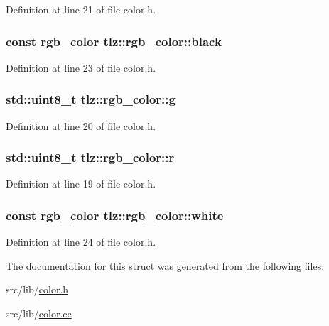 Definition at line 21 of file color.\+h.

\subsubsection[{\texorpdfstring{black}{black}}]{\setlength{\rightskip}{0pt plus 5cm}const {\bf rgb\+\_\+color} tlz\+::rgb\+\_\+color\+::black\hspace{0.3cm}{\ttfamily [static]}}\hypertarget{structtlz_1_1rgb__color_a00d04fc2f15d2d18a3d7555bf97920c7}{}\label{structtlz_1_1rgb__color_a00d04fc2f15d2d18a3d7555bf97920c7}


Definition at line 23 of file color.\+h.

\subsubsection[{\texorpdfstring{g}{g}}]{\setlength{\rightskip}{0pt plus 5cm}std\+::uint8\+\_\+t tlz\+::rgb\+\_\+color\+::g}\hypertarget{structtlz_1_1rgb__color_a2f9695262ce9c151330413fc0f0b4f2c}{}\label{structtlz_1_1rgb__color_a2f9695262ce9c151330413fc0f0b4f2c}


Definition at line 20 of file color.\+h.

\subsubsection[{\texorpdfstring{r}{r}}]{\setlength{\rightskip}{0pt plus 5cm}std\+::uint8\+\_\+t tlz\+::rgb\+\_\+color\+::r}\hypertarget{structtlz_1_1rgb__color_a837fcb70e392747f6a144b7924c01c97}{}\label{structtlz_1_1rgb__color_a837fcb70e392747f6a144b7924c01c97}


Definition at line 19 of file color.\+h.

\subsubsection[{\texorpdfstring{white}{white}}]{\setlength{\rightskip}{0pt plus 5cm}const {\bf rgb\+\_\+color} tlz\+::rgb\+\_\+color\+::white\hspace{0.3cm}{\ttfamily [static]}}\hypertarget{structtlz_1_1rgb__color_ad017cfc7d158ccb8ed15551b72eb232e}{}\label{structtlz_1_1rgb__color_ad017cfc7d158ccb8ed15551b72eb232e}


Definition at line 24 of file color.\+h.



The documentation for this struct was generated from the following files\+:\begin{DoxyCompactItemize}
\item 
src/lib/\hyperlink{color_8h}{color.\+h}\item 
src/lib/\hyperlink{color_8cc}{color.\+cc}\end{DoxyCompactItemize}
